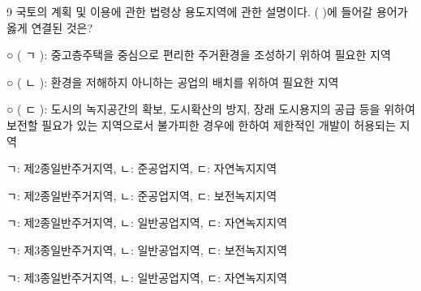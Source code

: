\begin{question}{9}
국토의 계획 및 이용에 관한 법령상 용도지역에 관한 설명이다. ( )에 들어갈 용어가 옳게 연결된 것은?
\begin{framedtext}
○ ( ㄱ ): 중고층주택을 중심으로 편리한 주거환경을 조성하기 위하여 필요한 지역 \par
○ ( ㄴ ): 환경을 저해하지 아니하는 공업의 배치를 위하여 필요한 지역 \par
○ ( ㄷ ): 도시의 녹지공간의 확보, 도시확산의 방지, 장래 도시용지의 공급 등을 위하여 보전할 필요가 있는 지역으로서 불가피한 경우에 한하여 제한적인 개발이 허용되는 지역 \par
\end{framedtext}
\begin{choices}
  \item ㄱ: 제2종일반주거지역, ㄴ: 준공업지역, ㄷ: 자연녹지지역
  \item ㄱ: 제2종일반주거지역, ㄴ: 준공업지역, ㄷ: 보전녹지지역
  \item ㄱ: 제2종일반주거지역, ㄴ: 일반공업지역, ㄷ: 자연녹지지역
  \item ㄱ: 제3종일반주거지역, ㄴ: 일반공업지역, ㄷ: 보전녹지지역
  \item ㄱ: 제3종일반주거지역, ㄴ: 일반공업지역, ㄷ: 자연녹지지역
\end{choices}
\end{question}
